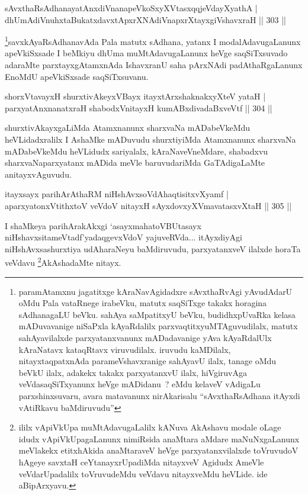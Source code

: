 \begin{shl}
sAvxthaRsAdhanayatAnxdiVnanapeVkoSxyXVtasxqqjeVdayXyathA |
dhUmAdiVnuhxtaBukatxdavxtApxrXNAdiVnapxrXtayxgiVshavxraH \hfill || 303 ||
\end{shl}

\begin{artha}
\footnote{paramAtamxnu jagatitxge kAraNavAgidadxre sAvxthaRvAgi yAvudAdarU oMdu Pala vataRnege irabeVku, matutx saqSiTxge takakx horagina sAdhanagaLU beVku. sahAya saMpatitxyU beVku, budidhxpUvaRka kelasa mADuvavanige niSaPxla kAyaRdalilx parxvaqtitxyuMTAguvudilalx, matutx sahAyavilalxde parxyatanxvanunx mADadavanige yAva kAyaRdalUlx kAraNatavx kataqRtavx viruvudilalx. iruvudu kaMDilalx, nitayxtaqpatxnAda parameVshavxranige sahAyavU ilalx, tanage oMdu beVkU ilalx, adakekx takakx parxyatanxvU ilalx, hiVgiruvAga veVdasaqSiTxyanunx heVge mADidanu~? eMdu kelaveV vAdigaLu parxshinxsuvaru, avara matavanunx nirAkarisalu ``sAvxthaRsAdhana itAyxdi vAtiRkavu baMdiruvudu''}savxkAyaRsAdhanavAda Pala matutx sAdhana, yatanx I modalAdavugaLanunx apeVkiSxsade I beMkiyu dhUma muMtAdavugaLanunx heVge saqSiTxsuvado adaraMte parxtayxgAtamxnAda IshavxranU saha pArxNAdi padAthaRgaLanunx EnoMdU apeVkiSxsade saqSiTxsuvanu.
\end{artha}

\begin{shl}
shorxVtavayxH shurxtivAkeyxVBayx itayxtArx\s \s shaknakxyXteV yataH |
parxyatAnxnanatxraH shabodxV\s nitayxH kumABxdivadaBxveVtf \hfill || 304 ||
\end{shl}

\begin{artha}
shurxtivAkayxgaLiMda Atamxnanunx sharxvaNa mADabeVkeMdu heVLidadxralilx I AshaMke mADuvudu shurxtiyiMda Atamxnanunx sharxvaNa mADabeVkeMdu heVLidudx sariyalalx, kAraNaveVneMdare, shabadxvu sharxvaNaparxyatanx mADida meVle baruvudariMda GaTAdigaLaMte anitayxvAguvudu.
\end{artha}

\begin{shl}
itayxsayx parihArAthaRM niHshAvxsoVdAhaqtisitxvXyamf |
aparxyatonxVtithxtoV veVdoV nitayxH sAyxdovxyXVmavatasxvXtaH \hfill || 305 ||
\end{shl}

\begin{artha}
I shaMkeya parihArakAkxgi `asayxmahatoVBUtasayx niHshavxsitameVtadf'\break yadaqgevxVdoV yajuveRVda... itAyxdiyAgi niHshAvxsashurxtiya udAharaNeyu baMdiruvudu, parxyatanxveV ilalxde horaTa veVdavu \footnote{ililx vApiVkUpa muMtAdavugaLalilx kANuva AkAshavu modale oLage idudx vApiVkUpagaLanunx nimiRsida anaMtara aMdare maNuNxgaLanunx meVlakekx etitxhAkida anaMtaraveV heVge parxyatanxvilalxde toVruvudoV hAgeye savxtaH ceYtanayxrUpadiMda nitayxveV Agidudx AmeVle veVdarUpadalilx toVruvudeMdu veVdavu nitayxveMdu heVLide. ide aBipArxyavu.}AkAshadaMte nitayx.
\end{artha}

